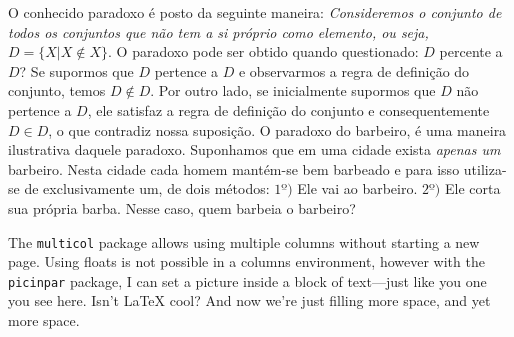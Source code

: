 \documentclass{article}
\begin{document}
\begin{multicols}{3}
    \begin{window}  
    O conhecido paradoxo é posto da seguinte maneira: \emph{Consideremos o conjunto de todos os conjuntos que não tem a si próprio como elemento, ou seja, $D = \{X | X \not\in X\}$}. O paradoxo pode ser obtido quando questionado: $D$ percente a $D$? Se supormos que $D$ pertence a $D$ e observarmos a regra de definição do conjunto, temos $D \not\in D$. Por outro lado, se inicialmente supormos que $D$ não pertence a $D$, ele satisfaz a regra de definição do conjunto e consequentemente $D \in D$, o que contradiz nossa suposição. O paradoxo do barbeiro, é uma maneira ilustrativa daquele paradoxo. Suponhamos que em uma cidade exista \emph{apenas um} barbeiro. Nesta cidade cada homem mantém-se bem barbeado e para isso utiliza-se de exclusivamente um, de dois métodos: $1º)$ Ele vai ao barbeiro. $2º)$ Ele corta sua própria barba. Nesse caso, quem barbeia o barbeiro?
    \end{window}
    \closearticle

    \begin{window} The \verb+multicol+ package allows using multiple columns without starting a new page.  Using floats is not possible in a columns environment, however with the \verb+picinpar+ package, I can set a picture inside a block of text---just like you one you see here.  Isn't \LaTeX{} cool?
And now we're just filling more space, and yet more space.  
    \end{window}
    \closearticle
\end{multicols}
\end{document}
